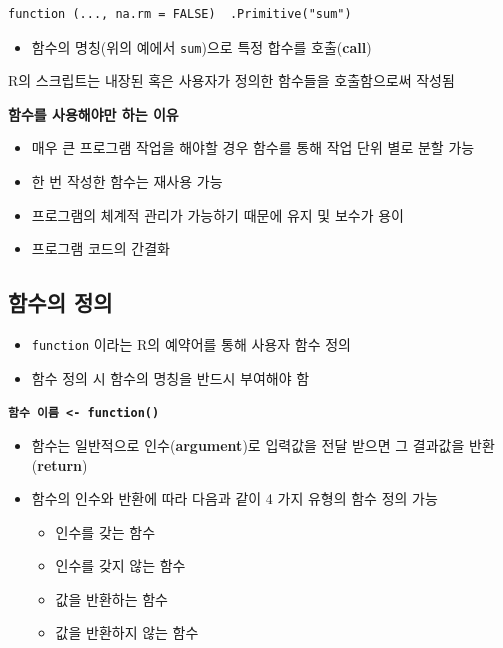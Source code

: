 \documentclass[
  11pt,
]{krantz}
\makeatletter
\providecommand{\tightlist}{%
  \setlength{\itemsep}{0pt}\setlength{\parskip}{0pt}}
\newenvironment{kframe}{%
\medskip{}
\setlength{\fboxsep}{.8em}
 \def\at@end@of@kframe{}%
 \ifinner\ifhmode%
  \def\at@end@of@kframe{\end{minipage}}%
  \begin{minipage}{\columnwidth}%
 \fi\fi%
 \def\FrameCommand##1{\hskip\@totalleftmargin \hskip-\fboxsep
 \colorbox{shadecolor}{##1}\hskip-\fboxsep
     \hskip-\linewidth \hskip-\@totalleftmargin \hskip\columnwidth}%
 \MakeFramed {\advance\hsize-\width
   \@totalleftmargin\z@ \linewidth\hsize
   \@setminipage}}%
 {\par\unskip\endMakeFramed%
 \at@end@of@kframe}
\newenvironment{rmdblock}[1]
  {
  \begin{itemize}
  \renewcommand{\labelitemi}{
    \raisebox{-.7\height}[0pt][0pt]{
      {\setkeys{Gin}{width=3em,keepaspectratio}\texttt{[image: images/\#1]}}
    }
  }
  \setlength{\fboxsep}{1em}
  \begin{kframe}
  \item
  }
  {
  \end{kframe}
  \end{itemize}
  }
\newenvironment{rmdnote}
  {\begin{rmdblock}{note}}
  {\end{rmdblock}}
\renewenvironment{quote}{\begin{kframe}}{\end{kframe}}
\makeatother
\begin{document}
\begin{verbatim}
function (..., na.rm = FALSE)  .Primitive("sum")
\end{verbatim}

\normalsize

\begin{itemize}
\tightlist
\item
  함수의 명칭(위의 예에서 \texttt{sum})으로 특정 합수를 호출(\textbf{call})
\end{itemize}

\footnotesize

\begin{rmdnote}
R의 스크립트는 내장된 혹은 사용자가 정의한 함수들을 호출함으로써 작성됨
\end{rmdnote}

\normalsize

\textbf{함수를 사용해야만 하는 이유}

\begin{itemize}
\tightlist
\item
  매우 큰 프로그램 작업을 해야할 경우 함수를 통해 작업 단위 별로 분할 가능
\item
  한 번 작성한 함수는 재사용 가능
\item
  프로그램의 체계적 관리가 가능하기 때문에 유지 및 보수가 용이
\item
  프로그램 코드의 간결화
\end{itemize}

\hypertarget{uxd568uxc218uxc758-uxc815uxc758}{%
\subsection{함수의 정의}\label{uxd568uxc218uxc758-uxc815uxc758}}

\begin{itemize}
\tightlist
\item
  \texttt{function} 이라는 R의 예약어를 통해 사용자 함수 정의
\item
  함수 정의 시 함수의 명칭을 반드시 부여해야 함
\end{itemize}

\begin{quote}
\textbf{\texttt{함수\ 이름\ \textless{}-\ function()}}
\end{quote}

\begin{itemize}
\tightlist
\item
  함수는 일반적으로 인수(\textbf{argument})로 입력값을 전달 받으면 그 결과값을 반환(\textbf{return})
\item
  함수의 인수와 반환에 따라 다음과 같이 4 가지 유형의 함수 정의 가능

  \begin{itemize}
  \tightlist
  \item
    인수를 갖는 함수
  \item
    인수를 갖지 않는 함수
  \item
    값을 반환하는 함수
  \item
    값을 반환하지 않는 함수
  \end{itemize}
\end{itemize}
\end{document}
